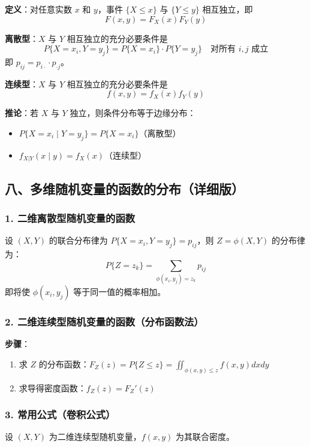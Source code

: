 \documentclass[12pt,a4paper]{ctexart}
\begin{document}
\textbf{定义}：对任意实数 $x$ 和 $y$，事件 $\{X \le x\}$ 与 $\{Y \le y\}$ 相互独立，即
\[
    F(x, y) = F_X(x) F_Y(y)
\]

\textbf{离散型}：$X$ 与 $Y$ 相互独立的充分必要条件是
\[
    P\{X = x_i, Y = y_j\} = P\{X = x_i\} \cdot P\{Y = y_j\} \quad \text{对所有 } i, j \text{ 成立}
\]
即 $p_{ij} = p_{i\cdot} \cdot p_{\cdot j}$。

\textbf{连续型}：$X$ 与 $Y$ 相互独立的充分必要条件是
\[
    f(x, y) = f_X(x) f_Y(y)
\]

\textbf{推论}：若 $X$ 与 $Y$ 独立，则条件分布等于边缘分布：
\begin{itemize}[noitemsep]
    \item $P\{X = x_i \mid Y = y_j\} = P\{X = x_i\}$（离散型）
    \item $f_{X|Y}(x \mid y) = f_X(x)$（连续型）
\end{itemize}

\subsection{八、多维随机变量的函数的分布（详细版）}

\subsubsection{1. 二维离散型随机变量的函数}
设 $(X, Y)$ 的联合分布律为 $P\{X = x_i, Y = y_j\} = p_{ij}$，则 $Z = \phi(X, Y)$ 的分布律为：
\[
    P\{Z = z_k\} = \sum_{\phi(x_i, y_j) = z_k} p_{ij}
\]
即将使 $\phi(x_i, y_j)$ 等于同一值的概率相加。

\subsubsection{2. 二维连续型随机变量的函数（分布函数法）}
\textbf{步骤}：
\begin{enumerate}[noitemsep]
    \item 求 $Z$ 的分布函数：$F_Z(z) = P\{Z \le z\} = \iint_{\phi(x, y) \le z} f(x, y) dx dy$
    \item 求导得密度函数：$f_Z(z) = F_Z'(z)$
\end{enumerate}

\subsubsection{3. 常用公式（卷积公式）}
设 $(X, Y)$ 为二维连续型随机变量，$f(x, y)$ 为其联合密度。
\end{document}
